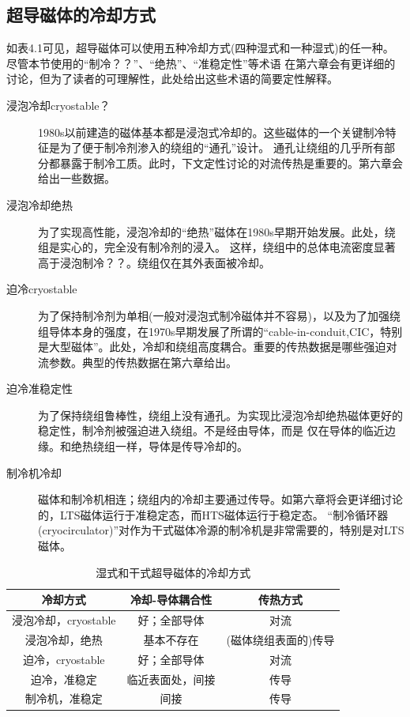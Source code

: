 \subsection*{超导磁体的冷却方式}
如表4.1可见，超导磁体可以使用五种冷却方式(四种湿式和一种湿式)的任一种。尽管本节使用的“制冷？？”、“绝热”、“准稳定性”等术语
在第六章会有更详细的讨论，但为了读者的可理解性，此处给出这些术语的简要定性解释。
\begin{description}
  \item[浸泡冷却cryostable？] 1980s以前建造的磁体基本都是浸泡式冷却的。这些磁体的一个关键制冷特征是为了便于制冷剂渗入的绕组的“通孔”设计。
  通孔让绕组的几乎所有部分都暴露于制冷工质。此时，下文定性讨论的对流传热是重要的。第六章会给出一些数据。
  \item[浸泡冷却绝热] 为了实现高性能，浸泡冷却的“绝热”磁体在1980s早期开始发展。此处，绕组是实心的，完全没有制冷剂的浸入。
  这样，绕组中的总体电流密度显著高于浸泡制冷？？。绕组仅在其外表面被冷却。
  \item[迫冷cryostable] 为了保持制冷剂为单相(一般对浸泡式制冷磁体并不容易)，以及为了加强绕组导体本身的强度，在1970s早期发展了所谓的“cable-in-conduit,CIC，特别是大型磁体”。此处，冷却和绕组高度耦合。重要的传热数据是哪些强迫对流参数。典型的传热数据在第六章给出。
  \item[迫冷准稳定性] 为了保持绕组鲁棒性，绕组上没有通孔。为实现比浸泡冷却绝热磁体更好的稳定性，制冷剂被强迫进入绕组。不是经由导体，而是
  仅在导体的临近边缘。和绝热绕组一样，导体是传导冷却的。
  \item[制冷机冷却] 磁体和制冷机相连；绕组内的冷却主要通过传导。如第六章将会更详细讨论的，LTS磁体运行于准稳定态，而HTS磁体运行于稳定态。
  “制冷循环器(cryocirculator)”对作为干式磁体冷源的制冷机是非常需要的，特别是对LTS磁体。
\end{description}
\begin{table}[htbp]\small
  \centering
  \caption{湿式和干式超导磁体的冷却方式} \label{coolingmethod}
\begin{tabular}{|c|c|c|}
  \hline
\textbf{冷却方式}&\textbf{冷却-导体耦合性}&\textbf{传热方式} \\ \hline \hline
浸泡冷却，cryostable & 好；全部导体& 对流\\ \hline
浸泡冷却，绝热 & 基本不存在 &(磁体绕组表面的)传导 \\ \hline
迫冷，cryostable &好；全部导体&对流\\ \hline
迫冷，准稳定 &临近表面处，间接&传导\\ \hline\hline
制冷机，准稳定&间接 &传导 \\ \hline
\end{tabular}
\end{table}

